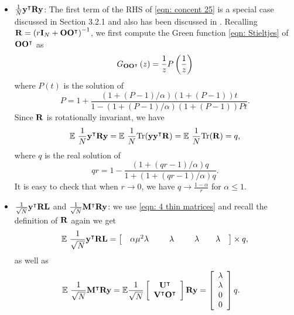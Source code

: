 \documentclass[9pt,twocolumn]{pnas-new}
\begin{document}
\begin{itemize}
    \item $\frac{1}{N}\mathbf{y}^\intercal\mathbf{R}\mathbf{y}$: 
    The first term of the RHS of \ref{eqn: concent 25} is a special case discussed in Section 3.2.1
    \cite{pennington2017nonlinear} and also has been discussed in \cite{dupic2014spectral}. Recalling $\mathbf{R}=\left(r\mathbf{I}_N+\mathbf{O}\mathbf{O}^{\intercal}\right)^{-1}$, we first compute the Green function \ref{eqn: Stieltjes} of $\mathbf{O}\mathbf{O}^{\intercal}$ as
    \[
    G_{\mathbf{O}\mathbf{O}^{\intercal}}\left(z\right)=\frac{1}{z}P\left(\frac{1}{z}\right)
    \]
    where $P\left(t\right)$ is the solution of
    \begin{equation}
    P=1+\frac{\left(1+\left(P-1\right)/\alpha\right)\left(1+\left(P-1\right)\right)t}{1-\left(1+\left(P-1\right)/\alpha\right)\left(1+\left(P-1\right)\right)Pt}.\label{eq: Pennington}
    \end{equation}
    Since $\mathbf{R}$ is rotationally invariant, we have $$\mathbb{E}~\frac{1}{N}\mathbf{y}^\intercal\mathbf{R}\mathbf{y}=\mathbb{E}~\frac{1}{N}\mathrm{Tr}(\mathbf{y}\mathbf{y}^\intercal \mathbf{R})= \mathbb{E}~\frac{1}{N} \mathrm{Tr}(\mathbf{R})=q,$$ where $q$ is the real solution of
    \[
    qr=1-\frac{\left(1+\left(qr-1\right)/\alpha\right)q}{1+\left(1+\left(qr-1\right)/\alpha\right)q}.
    \]
    It is easy to check that when $r\to0$, we have $q\to\frac{1-\alpha}{r}$ for $\alpha\leq1$.

    \item $\frac{1}{\sqrt{N}}\mathbf{y}^{\intercal}\mathbf{R}\mathbf{L}$ and $\frac{1}{\sqrt{N}}\mathbf{M}^{\intercal}\mathbf{R}\mathbf{y}$: we use \eqref{eqn: 4 thin matrices} and recall the definition of $\mathbf{R}$ again we get
    \begin{align*}
    \mathbb{E}~\frac{1}{\sqrt{N}}\mathbf{y}^{\intercal}\mathbf{R}\mathbf{L} =\left[\begin{array}{cc}
    \begin{array}{cc}
    \alpha\mu^{2}\lambda & \quad\end{array}\lambda & \quad\begin{array}{cc}
    \lambda & \quad\lambda\end{array}\end{array}\right]\times q,
    \end{align*}
    as well as
    \begin{align*}
    \mathbb{E}~\frac{1}{\sqrt{N}}\mathbf{M}^{\intercal}\mathbf{R}\mathbf{y} & =\mathbb{E}\frac{1}{\sqrt{N}}\left[\begin{array}{c}
    \mathbf{U}^{\intercal}\\
    \mathbf{V}^{\intercal}\mathbf{O}^{\intercal}
    \end{array}\right]\mathbf{R}\mathbf{y}=\left[\begin{array}{c}
    \lambda\\
    \lambda\\
    0\\
    0
    \end{array}\right]q.
    \end{align*}


\end{itemize}
\end{document}
